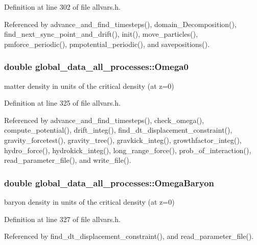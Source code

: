 Definition at line 302 of file allvars.h.



Referenced by advance\_\-and\_\-find\_\-timesteps(), domain\_\-Decomposition(), find\_\-next\_\-sync\_\-point\_\-and\_\-drift(), init(), move\_\-particles(), pmforce\_\-periodic(), pmpotential\_\-periodic(), and savepositions().

\hypertarget{structglobal__data__all__processes_abac5eca1b5851e670eec01d4dd47c417}{
\subsubsection[{Omega0}]{\setlength{\rightskip}{0pt plus 5cm}double {\bf global\_\-data\_\-all\_\-processes::Omega0}}}
\label{structglobal__data__all__processes_abac5eca1b5851e670eec01d4dd47c417}
matter density in units of the critical density (at z=0) 

Definition at line 325 of file allvars.h.



Referenced by advance\_\-and\_\-find\_\-timesteps(), check\_\-omega(), compute\_\-potential(), drift\_\-integ(), find\_\-dt\_\-displacement\_\-constraint(), gravity\_\-forcetest(), gravity\_\-tree(), gravkick\_\-integ(), growthfactor\_\-integ(), hydro\_\-force(), hydrokick\_\-integ(), long\_\-range\_\-force(), prob\_\-of\_\-interaction(), read\_\-parameter\_\-file(), and write\_\-file().

\hypertarget{structglobal__data__all__processes_a5656f8668fd420a86cb7372869745fee}{
\subsubsection[{OmegaBaryon}]{\setlength{\rightskip}{0pt plus 5cm}double {\bf global\_\-data\_\-all\_\-processes::OmegaBaryon}}}
\label{structglobal__data__all__processes_a5656f8668fd420a86cb7372869745fee}
baryon density in units of the critical density (at z=0) 

Definition at line 327 of file allvars.h.



Referenced by find\_\-dt\_\-displacement\_\-constraint(), and read\_\-parameter\_\-file().

